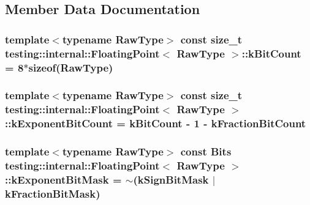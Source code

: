 \subsection{Member Data Documentation}
\hypertarget{classtesting_1_1internal_1_1_floating_point_ab819d2e8f93e9e482373999f0f8d71b9}{
\subsubsection[{k\+Bit\+Count}]{\setlength{\rightskip}{0pt plus 5cm}template$<$typename Raw\+Type$>$ const size\+\_\+t {\bf testing\+::internal\+::\+Floating\+Point}$<$ Raw\+Type $>$\+::k\+Bit\+Count = 8$\ast$sizeof(Raw\+Type)\hspace{0.3cm}{\ttfamily [static]}}}\label{classtesting_1_1internal_1_1_floating_point_ab819d2e8f93e9e482373999f0f8d71b9}
\hypertarget{classtesting_1_1internal_1_1_floating_point_a1973d843c00781053d3073daa8a40119}{
\subsubsection[{k\+Exponent\+Bit\+Count}]{\setlength{\rightskip}{0pt plus 5cm}template$<$typename Raw\+Type$>$ const size\+\_\+t {\bf testing\+::internal\+::\+Floating\+Point}$<$ Raw\+Type $>$\+::k\+Exponent\+Bit\+Count = {\bf k\+Bit\+Count} -\/ 1 -\/ {\bf k\+Fraction\+Bit\+Count}\hspace{0.3cm}{\ttfamily [static]}}}\label{classtesting_1_1internal_1_1_floating_point_a1973d843c00781053d3073daa8a40119}
\hypertarget{classtesting_1_1internal_1_1_floating_point_a66065dfc4d5f41100f686159637af23b}{
\subsubsection[{k\+Exponent\+Bit\+Mask}]{\setlength{\rightskip}{0pt plus 5cm}template$<$typename Raw\+Type$>$ const {\bf Bits} {\bf testing\+::internal\+::\+Floating\+Point}$<$ Raw\+Type $>$\+::k\+Exponent\+Bit\+Mask = $\sim$({\bf k\+Sign\+Bit\+Mask} $\vert$ {\bf k\+Fraction\+Bit\+Mask})\hspace{0.3cm}{\ttfamily [static]}}}\label{classtesting_1_1internal_1_1_floating_point_a66065dfc4d5f41100f686159637af23b}
